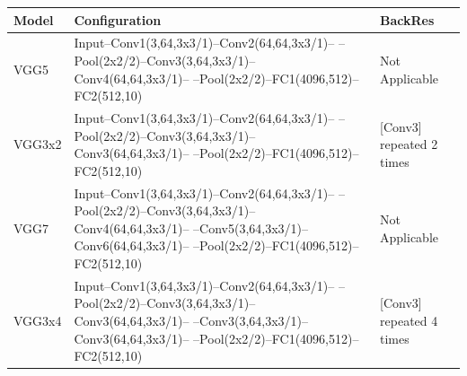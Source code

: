 \begin{tabular}{lll}
\toprule
Model & Configuration & BackRes \\
\midrule
VGG5 & Input–Conv1(3,64,3x3/1)–Conv2(64,64,3x3/1)– –Pool(2x2/2)–Conv3(3,64,3x3/1)–Conv4(64,64,3x3/1)– –Pool(2x2/2)–FC1(4096,512)–FC2(512,10) & Not Applicable \\
VGG3x2 & Input–Conv1(3,64,3x3/1)–Conv2(64,64,3x3/1)– –Pool(2x2/2)–Conv3(3,64,3x3/1)–Conv3(64,64,3x3/1)– –Pool(2x2/2)–FC1(4096,512)–FC2(512,10) & [Conv3] repeated 2 times \\
VGG7 & Input–Conv1(3,64,3x3/1)–Conv2(64,64,3x3/1)– –Pool(2x2/2)–Conv3(3,64,3x3/1)–Conv4(64,64,3x3/1)– –Conv5(3,64,3x3/1)–Conv6(64,64,3x3/1)– –Pool(2x2/2)–FC1(4096,512)–FC2(512,10) & Not Applicable \\
VGG3x4 & Input–Conv1(3,64,3x3/1)–Conv2(64,64,3x3/1)– –Pool(2x2/2)–Conv3(3,64,3x3/1)–Conv3(64,64,3x3/1)– –Conv3(3,64,3x3/1)–Conv3(64,64,3x3/1)– –Pool(2x2/2)–FC1(4096,512)–FC2(512,10) & [Conv3] repeated 4 times \\
\bottomrule
\end{tabular}
